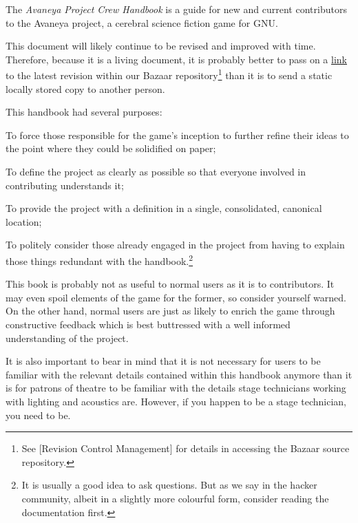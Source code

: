 

The {\it Avaneya Project Crew Handbook} is a guide for new and current contributors to the Avaneya project, a cerebral science fiction game for GNU. 

This document will likely continue to be revised and improved with time. Therefore, because it is a living document, it is probably better to pass on a \href{http://bazaar.launchpad.net/~avaneya/avaneya/trunk/view/head:/Documentation/Contributors/Handbook/Avaneya\%20Project\%20Crew\%20Handbook.pdf}{link} to the latest revision within our Bazaar repository\footnote[]{See [Revision Control Management] for details in accessing the Bazaar source repository.} than it is to send a static locally stored copy to another person.

This handbook had several purposes:

\startitemize[4]
\item
To force those responsible for the game's inception to further refine their ideas to the point where they could be solidified on paper;

\item
To define the project as clearly as possible so that everyone involved in contributing understands it;

\item
To provide the project with a definition in a single, consolidated, canonical location;

\item
To politely consider those already engaged in the project from having to explain those things redundant with the handbook.\footnote[rtfm]{It is usually a good idea to ask questions. But as we say in the hacker community, albeit in a slightly more colourful form, consider reading the documentation first.}
\stopitemize

This book is probably not as useful to normal users as it is to contributors. It may even spoil elements of the game for the former, so consider yourself warned. On the other hand, normal users are just as likely to enrich the game through constructive feedback which is best buttressed with a well informed understanding of the project.

It is also important to bear in mind that it is not necessary for users to be familiar with the relevant details contained within this handbook anymore than it is for patrons of theatre to be familiar with the details stage technicians working with lighting and acoustics are. However, if you happen to be a stage technician, you need to be.

\StopChapter


